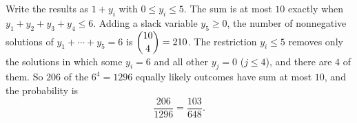 Write the results as $1+y_i$ with $0\le y_i\le5$. The sum is at most $10$ exactly when $y_1+y_2+y_3+y_4\le6$. Adding a slack variable $y_5\ge0$, the number of nonnegative solutions of $y_1+\cdots+y_5=6$ is $\dbinom{10}{4}=210$. The restriction $y_i\le5$ removes only the solutions in which some $y_i=6$ and all other $y_j=0$ ($j\le4$), and there are $4$ of them. So $206$ of the $6^4=1296$ equally likely outcomes have sum at most $10$, and the probability is
\[
\dfrac{206}{1296}=\boxed{\dfrac{103}{648}}.
\]
